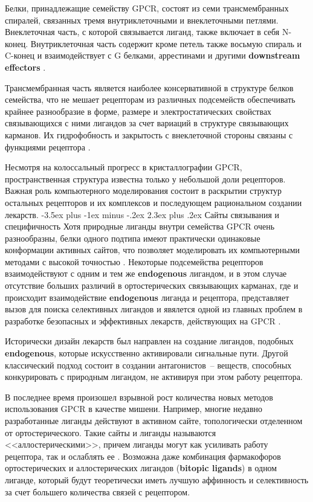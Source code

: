\documentclass[a4paper,14pt]{extreport}
\makeatletter
\renewcommand{\section}{\@startsection{section}{1}{0pt}%
	{-3.5ex plus -1ex minus -.2ex}%
	{2.3ex plus .2ex}%
	{\centering\hyphenpenalty=10000\normalfont\Large\bfseries}}
\makeatother
\begin{document}
	Белки, принадлежащие семейству GPCR, состоят из семи трансмембранных спиралей, связанных тремя внутриклеточными и внеклеточными петлями. Внеклеточная часть, с которой связывается лиганд, также включает в себя N-конец. Внутриклеточная часть содержит кроме петель также восьмую спираль и C-конец и взаимодействует с G белками, аррестинами и другими \textbf{downstream effectors}	\cite{Katritch2012Diversity}. 
	
	Трансмембранная часть является наиболее консервативной в структуре белков семейства, что не мешает рецепторам из различных подсемейств обеспечивать крайнее разнообразие в форме, размере и электростатических свойствах связывающихся с ними лигандов за счет вариаций в структуре связывающих карманов. 	
	Их гидрофобность и закрытость с внеклеточной стороны связаны с функциями рецептора \cite{Katritch2012Diversity}.
	
	Несмотря на колоссальный прогресс в кристаллографии GPCR, пространственная структура известна только у небольшой доли рецепторов. Важная роль компьютерного моделирования состоит в раскрытии структур остальных рецепторов и их комплексов \cite{KUFAREVA20141120} и последующем рациональном создании лекарств.
	\section{Сайты связывания и специфичность}
	Хотя природные лиганды внутри семейства GPCR очень разнообразны, белки одного подтипа имеют практически одинаковые конформации активных сайтов, что позволяет моделировать их компьютерными методами с высокой точностью
	\cite{Katritch2012}. Некоторые подсемейства рецепторов взаимодействуют с одним и тем же \textbf{endogenous} лигандом, и в этом случае отсутствие больших различий в ортостерических связывающих карманах, где и происходит взаимодействие \textbf{endogenous} лиганда и рецептора, представляет вызов для поиска селективных лигандов и явялется одной из главных проблем в разработке безопасных и эффективных лекарств, действующих на GPCR \cite{KATRITCH2011108}.
	
	Исторически дизайн лекарств был направлен на создание лигандов, подобных \textbf{endogenous}, которые искусственно активировали сигнальные пути. Другой классический подход состоит в создании антагонистов~-- веществ, способных конкурировать с природным лигандом, не активируя при этом работу рецептора. 
	
	В последнее время произошел взрывной рост количества новых методов использования GPCR в качестве мишени. Например, многие недавно разработанные лиганды действуют в активном сайте, топологически отделенном от ортостерического. Такие сайты и лиганды называются <<аллостерическими>>, причем лиганды могут как усиливать работу рецептора, так и ослаблять ее \cite{SHONBERG20153880}. Возможна даже комбинация фармакофоров ортостерических и аллостерических лигандов (\textbf{bitopic ligands}) в одном лиганде, который будут теоретически иметь лучшую аффинность и селективность за счет большего количества связей с рецептором\cite{Wootten2013}.
	
\end{document}
